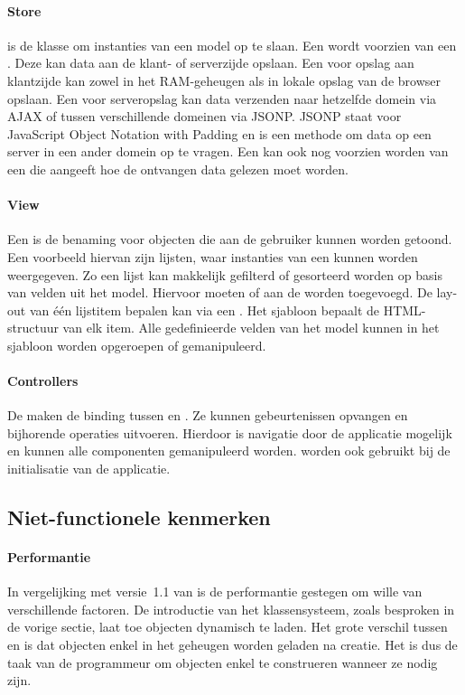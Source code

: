 \paragraph{Store}
 is de klasse om instanties van een model op te slaan.  
Een  wordt voorzien van een .  
Deze kan data aan de klant- of serverzijde opslaan.  
Een  voor opslag aan klantzijde kan zowel in het RAM-geheugen als in lokale opslag van de browser opslaan.  
Een  voor serveropslag kan data verzenden naar hetzelfde domein via AJAX of tussen verschillende domeinen via JSONP.  
JSONP staat voor JavaScript Object Notation with Padding en is een methode om data op een server in een ander domein op te vragen.
Een  kan ook nog voorzien worden van een  die aangeeft hoe de ontvangen data gelezen moet worden.

\paragraph{View}
Een  is de benaming voor objecten die aan de gebruiker kunnen worden getoond.  
Een voorbeeld hiervan zijn lijsten,  waar instanties van een  kunnen worden weergegeven.  
Zo een lijst kan makkelijk gefilterd of gesorteerd worden op basis van velden uit het model.
Hiervoor moeten  of  aan de  worden toegevoegd. 
De lay-out van één lijstitem bepalen kan via een .  
Het sjabloon bepaalt de HTML-structuur van elk item.  
Alle gedefinieerde velden van het model kunnen in het sjabloon worden opgeroepen of gemanipuleerd.

\paragraph{Controllers} 
De  maken de binding tussen  en .
Ze kunnen gebeurtenissen opvangen en bijhorende operaties uitvoeren.
Hierdoor is navigatie door de applicatie mogelijk en kunnen alle componenten gemanipuleerd worden.
 worden ook gebruikt bij de initialisatie van de applicatie.

\subsection{Niet-functionele kenmerken}
\paragraph{Performantie}
In vergelijking met versie~1.1 van \st{} is de performantie gestegen om wille van verschillende factoren.  
De introductie van het klassensysteem,  zoals besproken in de vorige sectie,  laat toe objecten dynamisch te laden. 
Het grote verschil tussen  en  is dat objecten enkel in het geheugen worden geladen na creatie.  
Het is dus de taak van de programmeur om objecten enkel te construeren wanneer ze nodig zijn.

